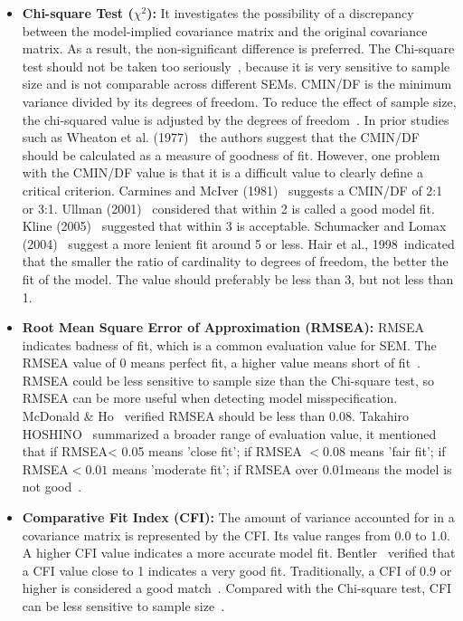 \begin{itemize}
\item \textbf{Chi-square Test ($\chi^2$):} It investigates the possibility of a discrepancy between the model-implied covariance matrix and the original covariance matrix. As a result, the non-significant difference is preferred. The Chi-square test should not be taken too seriously~\cite{ref22,ref23,ref24}, because it is very sensitive to sample size and is not comparable across different SEMs. CMIN/DF is the minimum variance divided by its degrees of freedom. To reduce the effect of sample size, the chi-squared value is adjusted by the degrees of freedom~\cite{ref41}. In prior studies such as Wheaton et al. (1977)~\cite{ref24} the authors suggest that the CMIN/DF should be calculated as a measure of goodness of fit. However, one problem with the CMIN/DF value is that it is a difficult value to clearly define a critical criterion. Carmines and McIver (1981)~\cite{ref36} suggests a CMIN/DF of 2:1 or 3:1. Ullman (2001)~\cite{ref37} considered that within 2 is called a good model fit. Kline (2005)~\cite{ref38} suggested that within 3 is acceptable. Schumacker and Lomax (2004)~\cite{ref39} suggest a more lenient fit around 5 or less. Hair et al., 1998~\cite{ref40}indicated that the smaller the ratio of cardinality to degrees of freedom, the better the fit of the model. The value should preferably be less than 3, but not less than 1.
\item \textbf{Root Mean Square Error of Approximation (RMSEA):}  RMSEA indicates badness of fit, which is a common evaluation value for SEM. The RMSEA value of 0 means perfect fit, a higher value means short of fit~\cite{ref25}. RMSEA could be less sensitive to sample size than the Chi-square test, so RMSEA can be more useful when detecting model misspecification. McDonald \& Ho~\cite{ref2} verified RMSEA should be less than 0.08. Takahiro HOSHINO~\cite{SEMres} summarized a broader range of evaluation value, it mentioned that if RMSEA< 0.05 means 'close fit'; if RMSEA $< 0.08$ means 'fair fit'; if RMSEA$< 0.01$ means 'moderate fit'; if RMSEA over 0.01means the model is not good~\cite{ref3,ref4,ref5}. 
\item \textbf{Comparative Fit Index (CFI):} The amount of variance accounted for in a covariance matrix is represented by the CFI. Its value ranges from 0.0 to 1.0. A higher CFI value indicates a more accurate model fit. Bentler~\cite{ref6} verified that a CFI value close to 1 indicates a very good fit. Traditionally, a CFI of 0.9 or higher is considered a good match~\cite{ref43,ref44}. Compared with the Chi-square test, CFI can be less sensitive to sample size~\cite{ref26}.
\end{itemize}


